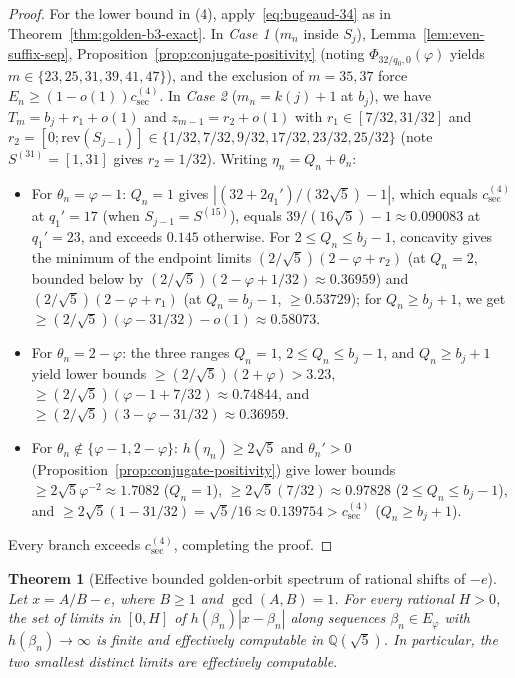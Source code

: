 \documentclass[11pt]{amsart}
\newtheorem{theorem}{Theorem}[section]
\theoremstyle{definition}
\theoremstyle{remark}
\numberwithin{equation}{section}
\newcommand{\Q}{\mathbb{Q}}
\begin{document}
\begin{proof}
For the lower bound in (4), apply~\eqref{eq:bugeaud-34} as in
Theorem~\ref{thm:golden-b3-exact}. In \emph{Case 1} ($m_n$ inside $S_j$),
Lemma~\ref{lem:even-suffix-sep}, Proposition~\ref{prop:conjugate-positivity}
(noting $\Phi_{32/q_0,0}(\varphi)$ yields $m\in\{23,25,31,39,41,47\}$), and
the exclusion of $m=35,37$ force $E_n\ge(1-o(1))c_{\mathrm{sec}}^{(4)}$.
In \emph{Case 2} ($m_n=k(j)+1$ at $b_j$), we have $T_m=b_j+r_1+o(1)$ and
$z_{m-1}=r_2+o(1)$ with $r_1\in[7/32,31/32]$ and
$r_2=[0;\mathrm{rev}(S_{j-1})]\in\{1/32,7/32,9/32,17/32,23/32,25/32\}$
(note $S^{(31)}=[1,31]$ gives $r_2=1/32$). Writing $\eta_n=Q_n+\theta_n$:
\begin{itemize}
\item For $\theta_n=\varphi-1$: $Q_n=1$ gives $|(32+2q_1')/(32\sqrt5)-1|$,
      which equals $c_{\mathrm{sec}}^{(4)}$ at $q_1'=17$ (when $S_{j-1}=S^{(15)}$),
      equals $39/(16\sqrt5)-1\approx0.090083$ at $q_1'=23$, and exceeds $0.145$
      otherwise. For $2\le Q_n\le b_j-1$, concavity gives the minimum of the
      endpoint limits $(2/\sqrt5)(2-\varphi+r_2)$ (at $Q_n=2$, bounded below by
      $(2/\sqrt5)(2-\varphi+1/32)\approx0.36959$) and $(2/\sqrt5)(2-\varphi+r_1)$
      (at $Q_n=b_j-1$, $\ge0.53729$); for $Q_n\ge b_j+1$, we get
      $\ge(2/\sqrt5)(\varphi-31/32)-o(1)\approx0.58073$.
\item For $\theta_n=2-\varphi$: the three ranges $Q_n=1$, $2\le Q_n\le b_j-1$,
      and $Q_n\ge b_j+1$ yield lower bounds $\ge(2/\sqrt5)(2+\varphi)>3.23$,
      $\ge(2/\sqrt5)(\varphi-1+7/32)\approx0.74844$, and
      $\ge(2/\sqrt5)(3-\varphi-31/32)\approx0.36959$.
\item For $\theta_n\notin\{\varphi-1,2-\varphi\}$: $h(\eta_n)\ge2\sqrt5$ and
      $\theta_n'>0$ (Proposition~\ref{prop:conjugate-positivity}) give lower
      bounds $\ge2\sqrt5\varphi^{-2}\approx1.7082$ ($Q_n=1$),
      $\ge2\sqrt5(7/32)\approx0.97828$ ($2\le Q_n\le b_j-1$), and
      $\ge2\sqrt5(1-31/32)=\sqrt5/16\approx0.139754>c_{\mathrm{sec}}^{(4)}$
      ($Q_n\ge b_j+1$).
\end{itemize}
Every branch exceeds $c_{\mathrm{sec}}^{(4)}$, completing the proof.
\end{proof}

\begin{theorem}[Effective bounded golden-orbit spectrum of rational shifts of $-e$]
\label{thm:golden-finite-shift}
Let $x=A/B-e$, where $B\ge1$ and $\gcd(A,B)=1$. For every rational
$H>0$, the set of limits in $[0,H]$ of $h(\beta_n)|x-\beta_n|$ along
sequences $\beta_n\in E_\varphi$ with $h(\beta_n)\to\infty$ is finite
and effectively computable in $\Q(\sqrt5)$. In particular, the two
smallest distinct limits are effectively computable.
\end{theorem}
\end{document}
